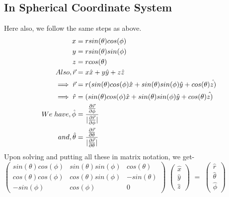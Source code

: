 \documentclass{book}
\begin{document}
\subsection{In Spherical Coordinate System}
Here also, we follow the same steps as above.
\begin{equation*}
\begin{split}
x&=rsin(\theta)cos(\phi)\\
y&=rsin(\theta)sin(\phi)\\
z&=rcos(\theta)\\
Also, \vec{r}&=x\hat{x}+y\hat{y}+z\hat{z}\\
\implies \vec{r}&=r(sin(\theta)cos(\phi)\hat{x}+sin(\theta)sin(\phi)\hat{y}+cos(\theta)\hat{z)}\\
\implies \hat{r}&=(sin(\theta)cos(\phi)\hat{x}+sin(\theta)sin(\phi)\hat{y}+cos(\theta)\hat{z)}\\
\vspace{0.25cm}
We\hspace{0.1cm}have,\hat{\phi}&=\frac{\frac{\partial \vec{r}}{\partial \phi}}{|\frac{\partial \vec{r}}{\partial \phi}|}\\
and,\hat{\theta}&=\frac{\frac{\partial \vec{r}}{\partial \theta}}{|\frac{\partial \vec{r}}{\partial \theta}|}\\
\end{split}
\end{equation*}
Upon solving and putting all these in matrix notation, we get-\
\\
$\begin{pmatrix}
sin(\theta)cos(\phi)  &  sin(\theta)sin(\phi)  &  cos(\theta)\\
cos(\theta)cos(\phi)  &  cos(\theta)sin(\phi)  &  -sin(\theta)\\
-sin(\phi)  &  cos(\phi)  &  0
\end{pmatrix}$
$\begin{pmatrix}
\hat{x}\\
\hat{y}\\
\hat{z}
\end{pmatrix}$
$=$
$\begin{pmatrix}
\hat{r}\\
\hat{\theta}\\
\hat{\phi}
\end{pmatrix}$
\\
\end{document}

